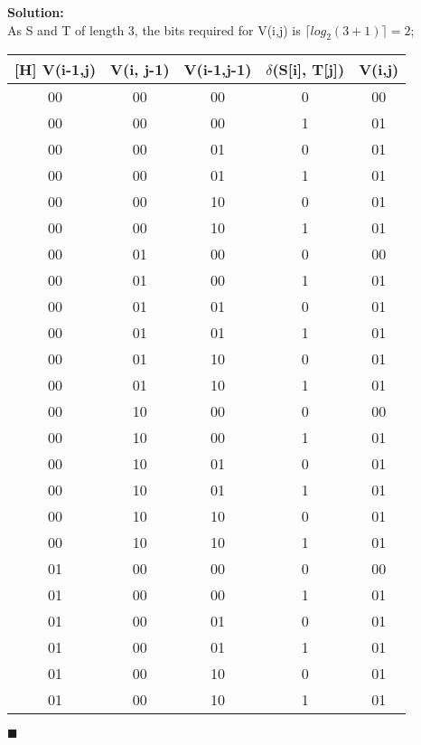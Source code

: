 \documentclass{article}
\newenvironment{solution}                               %
{\textbf{Solution:} \\}{$\blacksquare$\newline}         %
\begin{document}
    \begin{solution}
        As S and T of length 3, the bits required for V(i,j) is $\lceil log_2 (3+1)\rceil = 2$;
        \begin{center}
            \begin{tabular}{|c|c|c|c|c|}[H]
                V(i-1,j) & V(i, j-1) & V(i-1,j-1) & $\delta$(S[i], T[j]) & V(i,j) \\ \hline
                00 	&	 00 	&	 00 	&	 0 	&	 00 \\ 
                00 	&	 00 	&	 00 	&	 1 	&	 01 \\ \hline
                00 	&	 00 	&	 01 	&	 0 	&	 01 \\ 
                00 	&	 00 	&	 01 	&	 1 	&	 01 \\ \hline
                00 	&	 00 	&	 10 	&	 0 	&	 01 \\ 
                00 	&	 00 	&	 10 	&	 1 	&	 01 \\ \hline
                00 	&	 01 	&	 00 	&	 0 	&	 00 \\ 
                00 	&	 01 	&	 00 	&	 1 	&	 01 \\ \hline
                00 	&	 01 	&	 01 	&	 0 	&	 01 \\ 
                00 	&	 01 	&	 01 	&	 1 	&	 01 \\ \hline
                00 	&	 01 	&	 10 	&	 0 	&	 01 \\ 
                00 	&	 01 	&	 10 	&	 1 	&	 01 \\ \hline
                00 	&	 10 	&	 00 	&	 0 	&	 00 \\ 
                00 	&	 10 	&	 00 	&	 1 	&	 01 \\ \hline
                00 	&	 10 	&	 01 	&	 0 	&	 01 \\ 
                00 	&	 10 	&	 01 	&	 1 	&	 01 \\ \hline
                00 	&	 10 	&	 10 	&	 0 	&	 01 \\ 
                00 	&	 10 	&	 10 	&	 1 	&	 01 \\ \hline
                01 	&	 00 	&	 00 	&	 0 	&	 00 \\ 
                01 	&	 00 	&	 00 	&	 1 	&	 01 \\ \hline
                01 	&	 00 	&	 01 	&	 0 	&	 01 \\ 
                01 	&	 00 	&	 01 	&	 1 	&	 01 \\ \hline
                01 	&	 00 	&	 10 	&	 0 	&	 01 \\ 
                01 	&	 00 	&	 10 	&	 1 	&	 01 \\ \hline

\end{tabular}
\end{center}
\end{solution}
\end{document}
